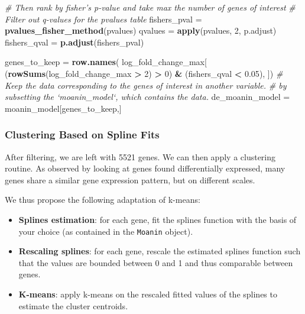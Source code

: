 \documentclass[9pt,a4paper,]{extarticle}
\newenvironment{Shaded}{\begin{snugshade}}{\end{snugshade}}
\newcommand{\CommentTok}[1]{\textcolor[rgb]{0.56,0.35,0.01}{\textit{#1}}}
\newcommand{\DecValTok}[1]{\textcolor[rgb]{0.00,0.00,0.81}{#1}}
\newcommand{\FloatTok}[1]{\textcolor[rgb]{0.00,0.00,0.81}{#1}}
\newcommand{\KeywordTok}[1]{\textcolor[rgb]{0.13,0.29,0.53}{\textbf{#1}}}
\newcommand{\NormalTok}[1]{#1}
\newcommand{\OperatorTok}[1]{\textcolor[rgb]{0.81,0.36,0.00}{\textbf{#1}}}
\newcommand{\StringTok}[1]{\textcolor[rgb]{0.31,0.60,0.02}{#1}}
\begin{document}
\begin{Shaded}
\begin{Highlighting}[]
\CommentTok{# Then rank by fisher's p-value and take max the number of genes of interest}
\CommentTok{# Filter out q-values for the pvalues table}
\NormalTok{fishers_pval =}\StringTok{ }\KeywordTok{pvalues_fisher_method}\NormalTok{(pvalues)}
\NormalTok{qvalues =}\StringTok{ }\KeywordTok{apply}\NormalTok{(pvalues, }\DecValTok{2}\NormalTok{, p.adjust)}
\NormalTok{fishers_qval =}\StringTok{ }\KeywordTok{p.adjust}\NormalTok{(fishers_pval)}

\NormalTok{genes_to_keep =}\StringTok{ }\KeywordTok{row.names}\NormalTok{(}
\NormalTok{    log_fold_change_max[}
\NormalTok{    (}\KeywordTok{rowSums}\NormalTok{(log_fold_change_max }\OperatorTok{>}\StringTok{ }\DecValTok{2}\NormalTok{) }\OperatorTok{>}\StringTok{ }\DecValTok{0}\NormalTok{) }\OperatorTok{&}
\StringTok{    }\NormalTok{(fishers_qval }\OperatorTok{<}\StringTok{ }\FloatTok{0.05}\NormalTok{), ])}
\CommentTok{# Keep the data corresponding to the genes of interest in another variable.}
\CommentTok{# by subsetting the `moanin_model`, which contains the data.}
\NormalTok{de_moanin_model =}\StringTok{ }\NormalTok{moanin_model[genes_to_keep,]}
\end{Highlighting}
\end{Shaded}

\hypertarget{clustering-based-on-spline-fits}{%
\subsubsection{Clustering Based on Spline Fits}\label{clustering-based-on-spline-fits}}

After filtering, we are left with 5521 genes. We can then apply a
clustering routine. As observed by looking at genes found differentially expressed,
many genes share a similar gene expression pattern, but on different scales.

We thus propose the following adaptation of k-means:

\begin{itemize}
\tightlist
\item
  \textbf{Splines estimation}: for each gene, fit the splines function with the basis
  of your choice (as contained in the \texttt{Moanin} object).
\item
  \textbf{Rescaling splines}: for each gene, rescale the estimated splines function
  such that the values are bounded between 0 and 1 and thus comparable between genes.
\item
  \textbf{K-means}: apply k-means on the rescaled fitted values of the splines to estimate the
  cluster centroids.
\end{itemize}
\end{document}
